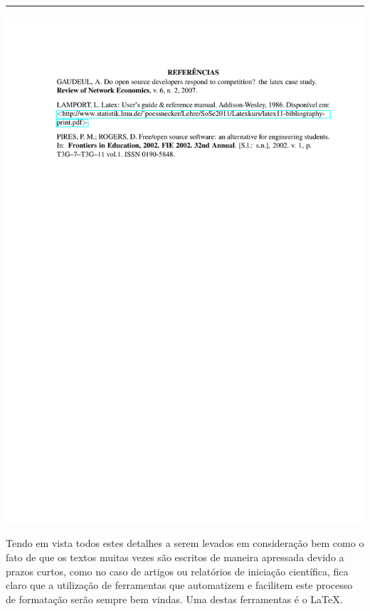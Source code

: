 {\hrule
\noindent\includegraphics[trim=0 20cm 0 0cm,clip]{conteudo/intro_modelo_conferencias/references/utf-refs}

\clearpage}
\restoregeometry

Tendo em vista todos estes detalhes a serem levados em consideração bem como o fato de que os textos muitas vezes são escritos de maneira apressada devido a prazos curtos, como no caso de artigos ou relatórios de iniciação científica, fica claro que a utilização de ferramentas que automatizem e facilitem este processo de formatação serão sempre bem vindas. Uma destas ferramentas é o \LaTeX.



